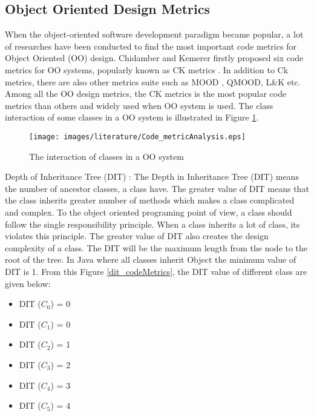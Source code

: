 \documentclass[12pt]{report}
\begin{document}

\subsection{Object Oriented Design Metrics}
When the  object-oriented software development paradigm became popular, a lot of researches have been conducted to find the most important code metrics for Object Oriented (OO) design. Chidamber and Kemerer firstly proposed six code metrics for OO systems, popularly known as CK metrics \cite{chidamber1994metrics}. In addition to Ck metrics, there are also other metrics suite such as MOOD \cite{bansiya2002hierarchical}, QMOOD, L\&K etc. Among all the OO design metrics, the CK metrics is the most popular code metrics than others and widely used when OO system is used. The class interaction of some classes in a OO system is illustrated in Figure \ref{interaction_of_classes_in_a_OO_system}. 
\begin{figure}[h!]
  \centering
    \texttt{[image: images/literature/Code\_metricAnalysis.eps]}
		\caption{The interaction of classes in a OO system}
		\label{interaction_of_classes_in_a_OO_system}
\end{figure}

Depth of Inheritance Tree (DIT) :
The Depth in Inheritance Tree (DIT) means the number of ancestor classes, a class have. The greater value of DIT means that the class inherits greater number of methods which makes a class complicated and complex. To the object oriented programing point of view, a class should follow the single responsibility principle. When a class inherits a lot of class, its violates this principle. The greater value of DIT also creates the design complexity of a class. The DIT will be the maximum length from the node to the root of the tree.  In Java where all classes inherit Object the minimum value of DIT is 1. 
From this Figure \ref{dit_codeMetrics}, the DIT value of different class are given below:
\begin{itemize}
	\item DIT ($C_{0}$) = 0
\item DIT ($C_{1}$) = 0
\item DIT ($C_{2}$) = 1
\item  DIT ($C_{3}$) = 2
\item DIT ($C_{4}$) = 3
\item DIT ($C_{5}$) = 4
\end{itemize}
\end{document}
